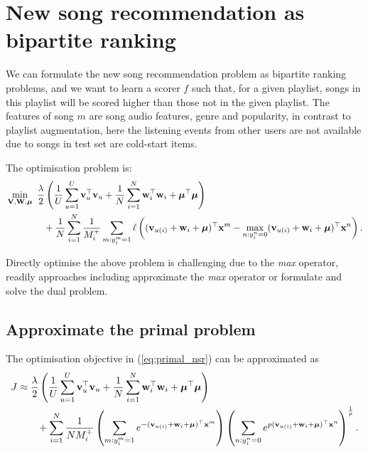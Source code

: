\section{New song recommendation as bipartite ranking}

We can formulate the new song recommendation problem as bipartite ranking problems, 
and we want to learn a scorer $f$ such that, for a given playlist, 
songs in this playlist will be scored higher than those not in the given playlist.
The features of song $m$ are song audio features, genre and popularity, in contrast to playlist augmentation,
here the listening events from other users are not available due to songs in test set are cold-start items.

The optimisation problem is:
\begin{equation}
\label{eq:primal_nsr}
\begin{aligned}
&\min_{\mathbf{V}, \mathbf{W}, \bm{\mu}} \ \frac{\lambda}{2} \left( \frac{1}{U} \sum_{u=1}^U \mathbf{v}_u^\top \mathbf{v}_u 
     + \frac{1}{N} \sum_{i=1}^N \mathbf{w}_i^\top \mathbf{w}_i + \bm{\mu}^\top \bm{\mu} \right) \\
& \hspace{4em}
     + \frac{1}{N} \sum_{i=1}^N \frac{1}{M_i^+} \sum_{m: y_i^m = 1} \ell \left( (\mathbf{v}_{u(i)} + \mathbf{w}_i + \bm{\mu})^\top \mathbf{x}^m 
     - \max_{n: y_i^n = 0} (\mathbf{v}_{u(i)} + \mathbf{w}_i + \bm{\mu})^\top \mathbf{x}^n \right).
\end{aligned}
\end{equation}

Directly optimise the above problem is challenging due to the \emph{max} operator,
readily approaches including approximate the \emph{max} operator or formulate and solve the dual problem.


\subsection{Approximate the primal problem}
The optimisation objective in (\ref{eq:primal_nsr}) can be approximated as
\begin{equation*}
\begin{aligned}
J 
&\approx \frac{\lambda}{2} \left( \frac{1}{U} \sum_{u=1}^U \mathbf{v}_u^\top \mathbf{v}_u + \frac{1}{N} \sum_{i=1}^N \mathbf{w}_i^\top \mathbf{w}_i + \bm{\mu}^\top \bm{\mu} \right) \\
& \hspace{2em}
  + \sum_{i=1}^N \frac{1}{N M_i^+} 
    \left( \sum_{m: y_i^m = 1} e^{-(\mathbf{v}_{u(i)} + \mathbf{w}_i + \bm{\mu})^\top \mathbf{x}^m} \right)
    \left( \sum_{n: y_i^n = 0} e^{p (\mathbf{v}_{u(i)} + \mathbf{w}_i + \bm{\mu})^\top \mathbf{x}^n} \right)^\frac{1}{p}.
\end{aligned}
\end{equation*}

